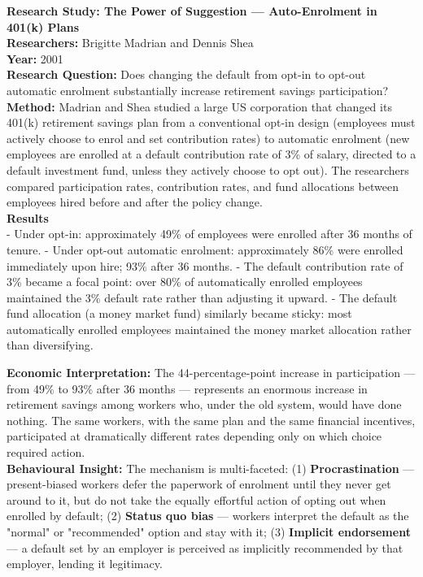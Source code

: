 \documentclass[12pt, letterpaper]{article}
\begin{document}
\begin{researchbox}
\textbf{Research Study: The Power of Suggestion --- Auto-Enrolment in 401(k) Plans}\\[4pt]

\textbf{Researchers:} Brigitte Madrian and Dennis Shea\\[4pt]
\textbf{Year:} 2001\\[4pt]
\textbf{Research Question:} Does changing the default from opt-in to opt-out automatic enrolment substantially increase retirement savings participation?\\[4pt]
\textbf{Method:} Madrian and Shea studied a large US corporation that changed its 401(k) retirement savings plan from a conventional opt-in design (employees must actively choose to enrol and set contribution rates) to automatic enrolment (new employees are enrolled at a default contribution rate of 3\% of salary, directed to a default investment fund, unless they actively choose to opt out). The researchers compared participation rates, contribution rates, and fund allocations between employees hired before and after the policy change.\\[4pt]
\textbf{Results}\\[4pt]
- Under opt-in: approximately 49\% of employees were enrolled after 36 months of tenure.
- Under opt-out automatic enrolment: approximately 86\% were enrolled immediately upon hire; 93\% after 36 months.
- The default contribution rate of 3\% became a focal point: over 80\% of automatically enrolled employees maintained the 3\% default rate rather than adjusting it upward.
- The default fund allocation (a money market fund) similarly became sticky: most automatically enrolled employees maintained the money market allocation rather than diversifying.

\textbf{Economic Interpretation:} The 44-percentage-point increase in participation --- from 49\% to 93\% after 36 months --- represents an enormous increase in retirement savings among workers who, under the old system, would have done nothing. The same workers, with the same plan and the same financial incentives, participated at dramatically different rates depending only on which choice required action.\\[4pt]

\textbf{Behavioural Insight:} The mechanism is multi-faceted: (1) \textbf{Procrastination} --- present-biased workers defer the paperwork of enrolment until they never get around to it, but do not take the equally effortful action of opting out when enrolled by default; (2) \textbf{Status quo bias} --- workers interpret the default as the "normal" or "recommended" option and stay with it; (3) \textbf{Implicit endorsement} --- a default set by an employer is perceived as implicitly recommended by that employer, lending it legitimacy.\\[4pt]
\end{researchbox}
\end{document}
